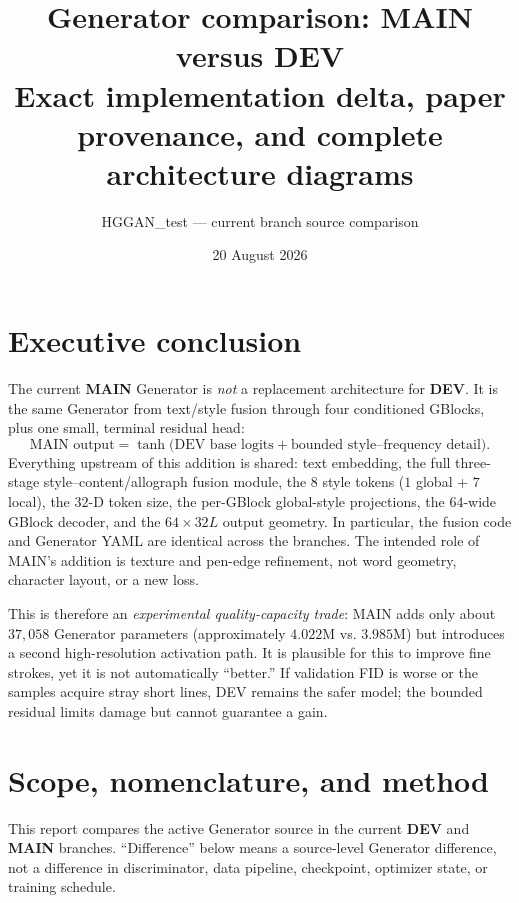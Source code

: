 \documentclass[10pt,a4paper]{article}
\title{\vspace{-1.5em}\textbf{Generator comparison: MAIN versus DEV}\\[-0.25em]
\large Exact implementation delta, paper provenance, and complete architecture diagrams}
\author{HGGAN\_test --- current branch source comparison}
\date{20 August 2026}
\newcommand{\dev}{\textcolor{blue!65!black}{\textbf{DEV}}}
\newcommand{\mainbranch}{\textcolor{orange!55!black}{\textbf{MAIN}}}
\begin{document}
\maketitle
\vspace{-1.0em}

\section*{Executive conclusion}

The current \mainbranch{} Generator is \emph{not} a replacement architecture for \dev.  It is the same Generator from text/style fusion through four conditioned GBlocks, plus one small, terminal residual head:
\[
  \text{MAIN output}=\tanh\big(\text{DEV base logits}+\text{bounded style--frequency detail}\big).
\]
Everything upstream of this addition is shared: text embedding, the full three-stage style--content/allograph fusion module, the $8$ style tokens ($1$ global + $7$ local), the $32$-D token size, the per-GBlock global-style projections, the $64$-wide GBlock decoder, and the $64\times32L$ output geometry.  In particular, the fusion code and Generator YAML are identical across the branches.  The intended role of MAIN's addition is texture and pen-edge refinement, not word geometry, character layout, or a new loss.

This is therefore an \emph{experimental quality-capacity trade}: MAIN adds only about $37{,}058$ Generator parameters (approximately $4.022$M vs. $3.985$M) but introduces a second high-resolution activation path.  It is plausible for this to improve fine strokes, yet it is not automatically ``better.''  If validation FID is worse or the samples acquire stray short lines, DEV remains the safer model; the bounded residual limits damage but cannot guarantee a gain.

\section{Scope, nomenclature, and method}

This report compares the active Generator source in the current \dev{} and \mainbranch{} branches.  ``Difference'' below means a source-level Generator difference, not a difference in discriminator, data pipeline, checkpoint, optimizer state, or training schedule.
\end{document}
